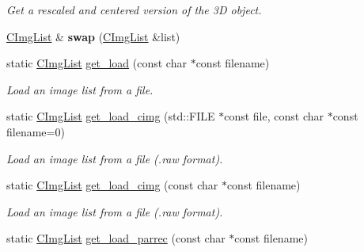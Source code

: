 \begin{DoxyCompactItemize}
\begin{DoxyCompactList}\small\item\em Get a rescaled and centered version of the 3D object. \item\end{DoxyCompactList}\item 
\hypertarget{structcimg__library_1_1_c_img_list_a0c5ee8f4894aa51d977e53735f47ca85}{
\hyperlink{structcimg__library_1_1_c_img_list}{CImgList} \& {\bfseries swap} (\hyperlink{structcimg__library_1_1_c_img_list}{CImgList} \&list)}
\label{structcimg__library_1_1_c_img_list_a0c5ee8f4894aa51d977e53735f47ca85}

\item 
\hypertarget{structcimg__library_1_1_c_img_list_a1caed2cc618a174e8ab6fb418eee02d9}{
static \hyperlink{structcimg__library_1_1_c_img_list}{CImgList} \hyperlink{structcimg__library_1_1_c_img_list_a1caed2cc618a174e8ab6fb418eee02d9}{get\_\-load} (const char $\ast$const filename)}
\label{structcimg__library_1_1_c_img_list_a1caed2cc618a174e8ab6fb418eee02d9}

\begin{DoxyCompactList}\small\item\em Load an image list from a file. \item\end{DoxyCompactList}\item 
\hypertarget{structcimg__library_1_1_c_img_list_a1dc19bf70de1c3e2144d88a51aa135cf}{
static \hyperlink{structcimg__library_1_1_c_img_list}{CImgList} \hyperlink{structcimg__library_1_1_c_img_list_a1dc19bf70de1c3e2144d88a51aa135cf}{get\_\-load\_\-cimg} (std::FILE $\ast$const file, const char $\ast$const filename=0)}
\label{structcimg__library_1_1_c_img_list_a1dc19bf70de1c3e2144d88a51aa135cf}

\begin{DoxyCompactList}\small\item\em Load an image list from a file (.raw format). \item\end{DoxyCompactList}\item 
\hypertarget{structcimg__library_1_1_c_img_list_ae46658b616de758970da7ed386823fc2}{
static \hyperlink{structcimg__library_1_1_c_img_list}{CImgList} \hyperlink{structcimg__library_1_1_c_img_list_ae46658b616de758970da7ed386823fc2}{get\_\-load\_\-cimg} (const char $\ast$const filename)}
\label{structcimg__library_1_1_c_img_list_ae46658b616de758970da7ed386823fc2}

\begin{DoxyCompactList}\small\item\em Load an image list from a file (.raw format). \item\end{DoxyCompactList}\item 
\hypertarget{structcimg__library_1_1_c_img_list_a35ef628a9224432225587787212a7c82}{
static \hyperlink{structcimg__library_1_1_c_img_list}{CImgList} \hyperlink{structcimg__library_1_1_c_img_list_a35ef628a9224432225587787212a7c82}{get\_\-load\_\-parrec} (const char $\ast$const filename)}
\label{structcimg__library_1_1_c_img_list_a35ef628a9224432225587787212a7c82}


\end{DoxyCompactItemize}
